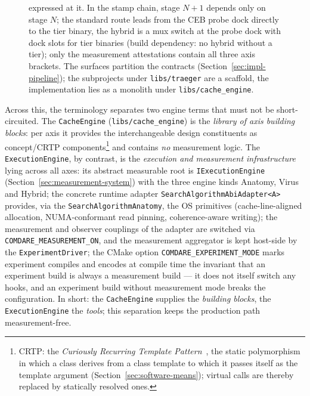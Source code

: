 \begin{nurlang}
\begin{figure}[htbp]
{expressed at it. In the stamp chain, stage $N+1$ depends only on stage $N$; the standard route leads from the CEB
probe dock directly to the tier binary, the hybrid is a mux switch at the probe dock with dock slots for tier
binaries (build dependency: no hybrid without a tier); only the measurement attestations contain all three axis
brackets.
The surfaces partition the contracts (Section~\ref{sec:impl-pipeline}); the subprojects under
\texttt{libs/traeger} are a scaffold, the implementation lies as a monolith under
\texttt{libs/cache\_engine}.}\label{fig:traeger-stufen}
\end{figure}
Across this, the terminology separates two engine terms that must not be short-circuited. The
\texttt{CacheEngine} (\texttt{libs/\allowbreak{}cache\_\allowbreak{}engine}) is the \emph{library of axis
building blocks}: per axis it provides the interchangeable design constituents as concept/CRTP
components\footnote{CRTP\@: the \emph{Curiously Recurring Template Pattern}~\cite{coplien1995crtp}, the
static polymorphism in which a class derives from a class template to which it passes itself as the
template argument (Section~\ref{sec:software-means}); virtual calls are thereby replaced by statically
resolved ones.} and contains \emph{no} measurement logic. The \texttt{ExecutionEngine}, by contrast, is
the \emph{execution and measurement infrastructure} lying across all axes: its abstract measurable root
is \texttt{IExecutionEngine} (Section~\ref{sec:measurement-system}) with the three engine kinds Anatomy,
Virus and Hybrid; the concrete runtime adapter \texttt{SearchAlgorithmAbiAdapter<A>} provides, via the
\texttt{SearchAlgorithmAnatomy}, the OS primitives (cache-line-aligned allocation, NUMA-conformant
read pinning, coherence-aware writing); the measurement and observer couplings of the adapter are
switched via \texttt{COMDARE\_\allowbreak{}MEASUREMENT\_\allowbreak{}ON}, and the measurement aggregator
is kept host-side by the \texttt{ExperimentDriver}; the CMake option
\texttt{COMDARE\_\allowbreak{}EXPERIMENT\_\allowbreak{}MODE} marks experiment compiles and encodes at
compile time the invariant that an experiment build is always a measurement build --- it does not
itself switch any hooks, and an experiment build without measurement mode breaks the configuration. In
short: the \texttt{CacheEngine} supplies the \emph{building blocks}, the \texttt{ExecutionEngine} the
\emph{tools}; this separation keeps the production path measurement-free.


\end{nurlang}
